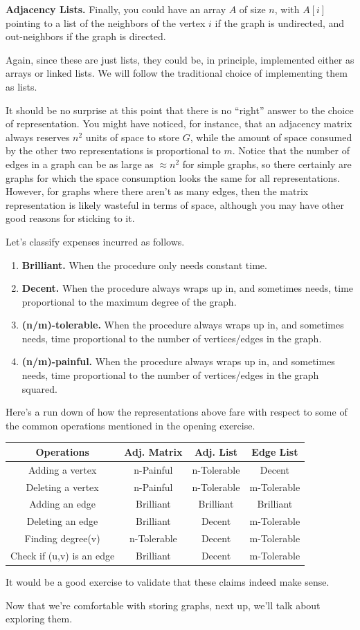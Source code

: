 \documentclass[
  letterpaper,
  DIV=11,
  numbers=noendperiod]{scrreprt}
\providecommand{\tightlist}{%
  \setlength{\itemsep}{0pt}\setlength{\parskip}{0pt}}\usepackage{longtable,booktabs,array}
\begin{document}
\textbf{Adjacency Lists.} Finally, you could have an array \(A\) of size
\(n\), with \(A[i]\) pointing to a list of the neighbors of the vertex
\(i\) if the graph is undirected, and out-neighbors if the graph is
directed.

Again, since these are just lists, they could be, in principle,
implemented either as arrays or linked lists. We will follow the
traditional choice of implementing them as lists.

It should be no surprise at this point that there is no ``right'' answer
to the choice of representation. You might have noticed, for instance,
that an adjacency matrix always reserves \(n^2\) units of space to store
\(G\), while the amount of space consumed by the other two
representations is proportional to \(m\). Notice that the number of
edges in a graph can be as large as \(\approx n^2\) for simple graphs,
so there certainly are graphs for which the space consumption looks the
same for all representations. However, for graphs where there aren't as
many edges, then the matrix representation is likely wasteful in terms
of space, although you may have other good reasons for sticking to it.

Let's classify expenses incurred as follows.

\begin{enumerate}
\def\labelenumi{\arabic{enumi}.}
\tightlist
\item
  \textbf{Brilliant.} When the procedure only needs constant time.
\item
  \textbf{Decent.} When the procedure always wraps up in, and sometimes
  needs, time proportional to the maximum degree of the graph.
\item
  \textbf{(n/m)-tolerable.} When the procedure always wraps up in, and
  sometimes needs, time proportional to the number of vertices/edges in
  the graph.
\item
  \textbf{(n/m)-painful.} When the procedure always wraps up in, and
  sometimes needs, time proportional to the number of vertices/edges in
  the graph squared.
\end{enumerate}

Here's a run down of how the representations above fare with respect to
some of the common operations mentioned in the opening exercise.

\begin{longtable}[]{@{}cccc@{}}
\toprule()
Operations & Adj. Matrix & Adj. List & Edge List \\
\midrule()
\endhead
Adding a vertex & n-Painful & n-Tolerable & Decent \\
Deleting a vertex & n-Painful & n-Tolerable & m-Tolerable \\
Adding an edge & Brilliant & Brilliant & Brilliant \\
Deleting an edge & Brilliant & Decent & m-Tolerable \\
Finding degree(v) & n-Tolerable & Decent & m-Tolerable \\
Check if (u,v) is an edge & Brilliant & Decent & m-Tolerable \\
\bottomrule()
\end{longtable}

It would be a good exercise to validate that these claims indeed make
sense.

Now that we're comfortable with storing graphs, next up, we'll talk
about exploring them.
\end{document}
